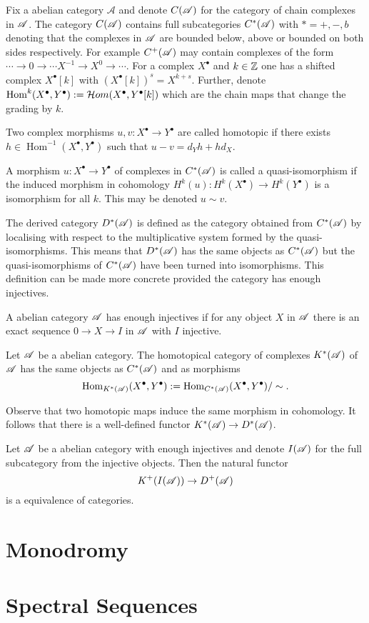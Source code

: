Fix a abelian category $\mathcal{A}$ and denote $C(\mathscr{A})$ for the category of chain complexes in $\mathscr{A}$.
The category $C(\mathscr{A})$ contains full subcategories $C^*(\mathscr{A})$ with $*= +, -, b$ denoting that the complexes in $\mathscr{A}$ are bounded below, above or bounded on both sides respectively.
For example $C^+(\mathscr{A})$ may contain complexes of the form $\cdots \to 0\to \cdots X^{-1} \to X^0 \to \cdots$.
For a complex $X^\bullet$ and $k\in \mathbb{Z}$ one has a shifted complex $X^\bullet[k]$ with $(X^\bullet[k])^s = X^{k+s}$.
Further, denote $\operatorname{Hom}^k(X^\bullet, Y^\bullet) :=  \mathcal{H}om(X^\bullet, Y^\bullet[k])$ which are the chain maps that change the grading by $k$.
\begin{definition}
  Two complex morphisms $u,v:X^\bullet\to Y^\bullet$ are called homotopic if there exists $h\in \operatorname{Hom}^{-1}(X^\bullet, Y^\bullet)$ such that $u-v = d_Y h + hd_X$.
\end{definition}
\begin{definition}
  A morphism $u:X^\bullet\to Y^\bullet$  of complexes in $C^*(\mathscr{A})$ is called a quasi-isomorphism if the induced morphism in cohomology $H^k(u):H^k(X^\bullet) \to H^k(Y^\bullet)$ is a isomorphism for all $k$. This may be denoted $u\sim v$.
\end{definition}
The derived category $D^*(\mathscr{A})$ is defined as the category obtained from $C^*(\mathscr{A})$ by localising with respect to the multiplicative system formed by the quasi-isomorphisms.
This means that $D^*(\mathscr{A})$ has the same objects as $C^*(\mathscr{A})$ but the quasi-isomorphisms of $C^*(\mathscr{A})$ have been turned into isomorphisms.
This definition can be made more concrete provided the category has enough injectives.
\begin{definition}
  A abelian category $\mathscr{A}$ has enough injectives if for any object $X$ in $\mathscr{A}$ there is an exact sequence $0\to X \to I$ in $\mathscr{A}$ with $I$ injective.
\end{definition}
\begin{definition}
  Let $\mathscr{A}$ be a abelian category.
  The homotopical category of complexes $K^*(\mathscr{A})$ of $\mathscr{A}$ has the same objects as $C^*(\mathscr{A})$ and as morphisms
  $$\operatorname{Hom}_{K^*(\mathscr{A})}(X^\bullet,Y^\bullet):= \operatorname{Hom}_{C^*(\mathscr{A})}(X^\bullet,Y^\bullet)/\sim.$$
\end{definition}
Observe that two homotopic maps induce the same morphism in cohomology.
It follows that there is a well-defined functor $K^*(\mathscr{A})\to D^*(\mathscr{A})$.
\begin{proposition}
  Let $\mathscr{A}$ be a abelian category with enough injectives and denote $I(\mathscr{A})$ for the full subcategory from the injective objects.
  Then the natural functor
  $$K^+(I(\mathscr{A}))\to D^+(\mathscr{A}) $$
  is a equivalence of categories.
\end{proposition}

\section{Monodromy}
\section{Spectral Sequences}
